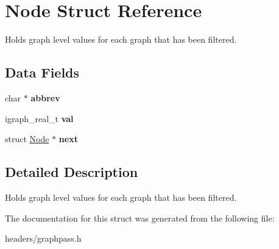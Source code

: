 \hypertarget{struct_node}{}\section{Node Struct Reference}
\label{struct_node}


Holds graph level values for each graph that has been filtered.  


\subsection*{Data Fields}
\begin{DoxyCompactItemize}
\item 
\mbox{\label{struct_node_a178c16b0a92c53ed7c1f4722db90a876}} 
char $\ast$ {\bfseries abbrev}
\item 
\mbox{\label{struct_node_ab4a7695864395a8fc4ee1182952ed4f4}} 
igraph\+\_\+real\+\_\+t {\bfseries val}
\item 
\mbox{\label{struct_node_aa162dd1e0693188a22b1f13b9a2a0ef0}} 
struct \mbox{\hyperlink{struct_node}{Node}} $\ast$ {\bfseries next}
\end{DoxyCompactItemize}


\subsection{Detailed Description}
Holds graph level values for each graph that has been filtered. 

The documentation for this struct was generated from the following file\+:\begin{DoxyCompactItemize}
\item 
headers/graphpass.\+h\end{DoxyCompactItemize}
